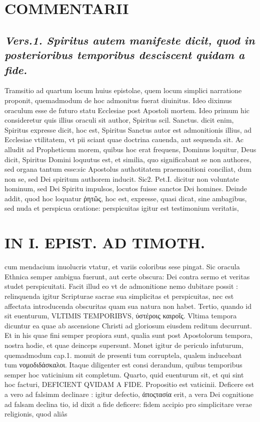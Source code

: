 \documentclass{article}
\begin{document}
\begin{pages}
\section*{COMMENTARII }
\marginpar{[ p.84 ]}
{}
\subsection*{\textit{Vers.1. Spiritus autem manifeste dicit, quod in posterioribus temporibus desciscent quidam a fide. }}\pstart Tramsitio ad quartum locum huius epistolae, quem locum simplici narratione proponit, quemadmodum de hoc admonitus fuerat diuinitus. Ideo diximus oraculum esse de futuro statu Ecclesiae post Apostoli mortem. Ideo primum hic consideretur quis illius oraculi sit author, Spiritus scil. Sanctus. dicit enim, Spiritus expresse dicit, hoc est, Spiritus Sanctus autor est admonitionis illius, ad Ecclesiae vtilitatem, vt pii sciant quae doctrina cauenda, aut sequenda sit.  \pend\pstart Ac alludit ad Propheticum morem, quibus hoc erat frequens, Dominus loquitur, Deus dicit, Spiritus Domini loquutus est, et similia, quo significabant se non authores, sed organa tantum esse:sic Apostolus authotitatem praemonitioni conciliat, dum non se, sed Dei spiritum authorem inducit. Sic2. Pet.I. dicitur non voluntate hominum, sed Dei Spiritu impulsos, locutos fuisse sanctos Dei homines.  \pend\pstart Deinde addit, quod hoc loquatur ῥητῶς, hoc est, expresse, quasi dicat, sine ambagibus, sed nuda et perspicua oratione: perspicuitas igitur est testimonium veritatis,  \pend
\section*{IN I. EPIST. AD TIMOTH. }
\marginpar{[ p.85 ]}\pstart cum mendacium inuolucris vtatur, et variis coloribus sese pingat. Sic oracula Ethnica semper ambigua fuerunt, aut certe obscura: Dei contra sermo et veritas studet perspicuitati. Facit illud eo vt de admonitione nemo dubitare possit : relinquenda igitur Scripturae sacrae sua simplicitas et perspicuitas, nec est affectata introducenda obscuritas quam sua natura non habet.  \pend\pstart Tertio, quando id sit euenturum, VLTIMIS TEMPORIBVS, ύστέροις καιροῖς. Vltima tempora dicuntur ea quae ab ascensione Christi ad gloriosum eiusdem reditum decurrunt. Et in his quae fini semper propiora sunt, qualia sunt post Apostolorum tempora, nostra hodie, et quae deinceps supersunt. Monet igitur de periculo infuturum, quemadmodum cap.1. monuit de presenti tum corruptela, qualem inducebant tum νομοδιδάσκαλοι. Itaque diligenter est consi derandum, quibus temporibus semper hoc vaticinium sit completum.  \pend\pstart Quarto, quid euenturum sit, et qui sint hoc facturi, DEFICIENT QVIDAM A FIDE. Propositio est vaticinii. Deficere est a vero ad falsimm declinare : igitur defectio, ἀποςτασία erit, a vera Dei cognitione ad falsam declina tio, id dixit a fide deficere: fidem accipio pro simplicitare verae religionis, quod aliâs  \pend

\end{pages}
\end{document}
